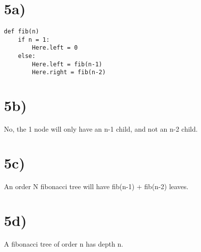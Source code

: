 \documentclass[a4paper,11pt]{article}
\begin{document}

\section*{5a)} 
\begin{verbatim}
def fib(n)
    if n = 1:
        Here.left = 0
    else:
        Here.left = fib(n-1)
        Here.right = fib(n-2)
\end{verbatim}

\section*{5b)} 
No, the 1 node will only have an n-1 child, and not an n-2 child.
\section*{5c)} 
An order N fibonacci tree will have fib(n-1) + fib(n-2) leaves.
\section*{5d)} 
A fibonacci tree of order n has depth n.

\end{document}
